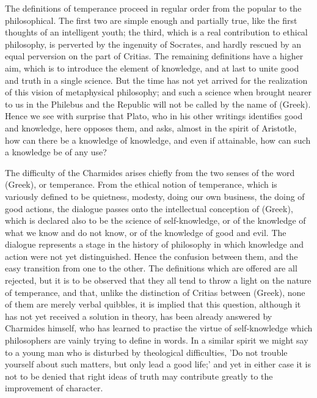 \documentclass[11pt,letter]{article}
\begin{document}
\par  The definitions of temperance proceed in regular order from the popular to the philosophical. The first two are simple enough and partially true, like the first thoughts of an intelligent youth; the third, which is a real contribution to ethical philosophy, is perverted by the ingenuity of Socrates, and hardly rescued by an equal perversion on the part of Critias. The remaining definitions have a higher aim, which is to introduce the element of knowledge, and at last to unite good and truth in a single science. But the time has not yet arrived for the realization of this vision of metaphysical philosophy; and such a science when brought nearer to us in the Philebus and the Republic will not be called by the name of (Greek). Hence we see with surprise that Plato, who in his other writings identifies good and knowledge, here opposes them, and asks, almost in the spirit of Aristotle, how can there be a knowledge of knowledge, and even if attainable, how can such a knowledge be of any use?

\par  The difficulty of the Charmides arises chiefly from the two senses of the word (Greek), or temperance. From the ethical notion of temperance, which is variously defined to be quietness, modesty, doing our own business, the doing of good actions, the dialogue passes onto the intellectual conception of (Greek), which is declared also to be the science of self-knowledge, or of the knowledge of what we know and do not know, or of the knowledge of good and evil. The dialogue represents a stage in the history of philosophy in which knowledge and action were not yet distinguished. Hence the confusion between them, and the easy transition from one to the other. The definitions which are offered are all rejected, but it is to be observed that they all tend to throw a light on the nature of temperance, and that, unlike the distinction of Critias between (Greek), none of them are merely verbal quibbles, it is implied that this question, although it has not yet received a solution in theory, has been already answered by Charmides himself, who has learned to practise the virtue of self-knowledge which philosophers are vainly trying to define in words. In a similar spirit we might say to a young man who is disturbed by theological difficulties, 'Do not trouble yourself about such matters, but only lead a good life;' and yet in either case it is not to be denied that right ideas of truth may contribute greatly to the improvement of character.
\end{document}
